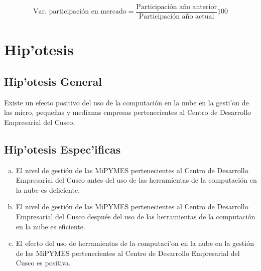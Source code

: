 \begin{equation}\label{eq:competitividad2}
    \text{Var. participaci\'on en mercado} = \frac{\text{Participaci\'on a\~no anterior}}{\text{Participaci\'on a\~no actual}}\text{100}
\end{equation}

\newpage
\section{Hip'otesis}

\subsection{Hip'otesis General}

Existe un efecto positivo del uso de la computaci\'on en la nube en la
gesti'on de las micro, peque\~nas y medianas empresas pertenecientes al Centro de
Desarrollo Empresarial del Cusco.

\subsection{Hip'otesis Espec'ificas}
\begin{enumerate}[a., noitemsep]
    \item El nivel de gesti\'on de las MiPYMES pertenecientes al Centro de Desarrollo
          Empresarial del Cusco antes del uso de las herramientas de la computaci\'on
          en la nube es deficiente.
    \item El nivel de gesti\'on de las MiPYMES pertenecientes al Centro de Desarrollo
          Empresarial del Cusco despu\'es del uso de las herramientas de la computaci\'on
          en la nube es eficiente.
    \item El efecto del uso de herramientas de la computaci'on en la nube en la
          gesti\'on de las MiPYMES pertenecientes al Centro de Desarrollo Empresarial
          del Cusco es positiva.
\end{enumerate}

